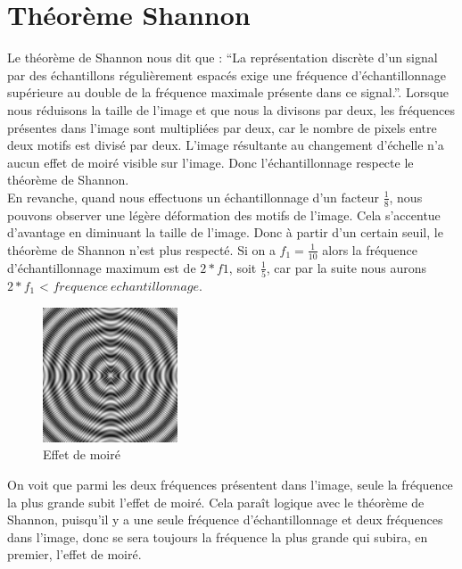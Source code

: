 \documentclass[a4paper,11pt]{article}
\begin{document}
  \section{Théorème Shannon}
  Le théorème de Shannon nous dit que : \enquote{La représentation discrète d'un signal par des échantillons régulièrement espacés exige une fréquence d'échantillonnage 
  supérieure au double de la fréquence maximale présente dans ce signal.}. Lorsque nous réduisons la taille de l’image et que nous la divisons par deux, les fréquences 
  présentes dans l’image sont multipliées par deux, car le nombre de pixels entre deux motifs est divisé par deux. L’image résultante au changement d’échelle n’a aucun effet 
  de moiré visible sur l’image. Donc l’échantillonnage respecte le théorème de Shannon.\\
  
  En revanche, quand nous effectuons un échantillonnage d’un facteur $\frac{1}{8}$, nous pouvons observer une légère déformation des motifs de l’image. Cela s’accentue 
  d’avantage en diminuant la taille de l’image. Donc à partir d’un certain seuil, le théorème de Shannon n’est plus respecté. 
  Si on a $f_1=\frac{1}{10}$ alors la fréquence d'échantillonnage maximum est de $2*f1$, soit $\frac{1}{5}$, car par la suite nous aurons $2*f_1$ < $frequence\ echantillonnage$.\\
  
  \begin{figure}[H]
   \centering
   \includegraphics[width=4cm]{../128_moire.png}
   \caption{Effet de moiré}
  \end{figure}


  On voit que parmi les deux fréquences présentent dans l’image, seule la fréquence la plus grande subit l’effet de moiré. Cela paraît logique avec le théorème de Shannon, 
  puisqu’il y a une seule fréquence d’échantillonnage et deux fréquences dans l’image, donc se sera toujours la fréquence la plus grande qui subira, en premier, l’effet de moiré.\\
\end{document}
